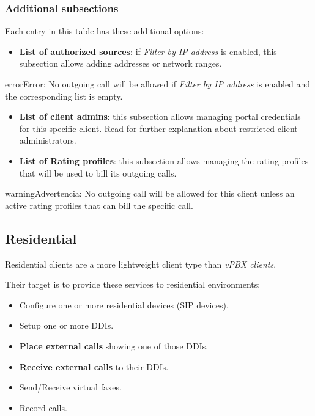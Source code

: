 \documentclass[letterpaper,10pt,spanish]{sphinxmanual}
\begin{document}
\subsubsection{Additional subsections}
\label{administration_portal/brand/clients/virtual_pbx:additional-subsections}
Each entry in this table has these additional options:
\begin{itemize}
\item {} 
\textbf{List of authorized sources}: if \emph{Filter by IP address} is enabled, this subsection allows adding addresses or network ranges.

\end{itemize}

\begin{notice}{error}{Error:}
No outgoing call will be allowed if \emph{Filter by IP address} is enabled and the corresponding list is empty.
\end{notice}
\begin{itemize}
\item {} 
\textbf{List of client admins}: this subsection allows managing portal credentials for this specific client. Read {\hyperref[api_rest/acls:acls]{}}
for further explanation about restricted client administrators.

\item {} 
\textbf{List of Rating profiles}: this subsection allows managing the rating profiles that will be used to bill its outgoing calls.

\end{itemize}

\begin{notice}{warning}{Advertencia:}
No outgoing call will be allowed for this client unless an active rating profiles that can
bill the specific call.
\end{notice}


\subsection{Residential}
\label{administration_portal/brand/clients/residential:residential}\label{administration_portal/brand/clients/residential::doc}
Residential clients are a more lightweight client type than \emph{vPBX clients}.

Their target is to provide these services to residential environments:
\begin{itemize}
\item {} 
Configure one or more residential devices (SIP devices).

\item {} 
Setup one or more DDIs.

\item {} 
\textbf{Place external calls} showing one of those DDIs.

\item {} 
\textbf{Receive external calls} to their DDIs.

\item {} 
Send/Receive virtual faxes.

\item {} 
Record calls.

\end{itemize}
\end{document}
